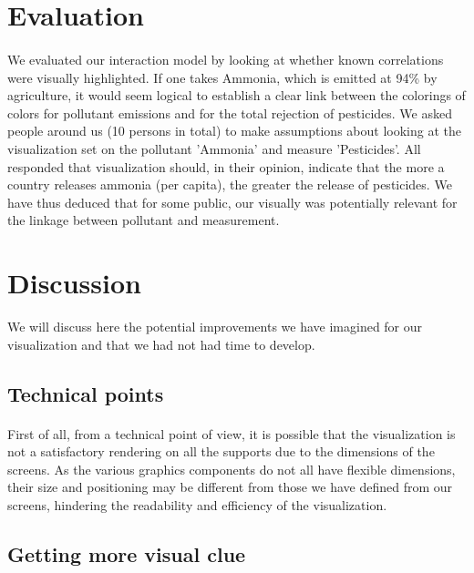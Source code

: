 \documentclass[preprint,journal]{vgtc}       %
\begin{document}
\section{Evaluation}

\paragraph{}
We evaluated our interaction model by looking at whether known correlations were visually highlighted.
If one takes Ammonia, which is emitted at 94\% by agriculture, it would seem logical to establish a clear link between the colorings of colors for pollutant emissions and for the total rejection of pesticides. We asked people around us (10 persons in total) to make assumptions about looking at the visualization set on the pollutant 'Ammonia' and measure 'Pesticides'. All responded that visualization should, in their opinion, indicate that the more a country releases ammonia (per capita), the greater the release of pesticides. We have thus deduced that for some public, our visually was potentially relevant for the linkage between pollutant and measurement.

\section{Discussion}

We will discuss here the potential improvements we have imagined for our visualization and that we had not had time to develop. 

\subsection{Technical points}

\paragraph{}
First of all, from a technical point of view, it is possible that the visualization is not a satisfactory rendering on all the supports due to the dimensions of the screens. As the various graphics components do not all have flexible dimensions, their size and positioning may be different from those we have defined from our screens, hindering the readability and efficiency of the visualization. 


\subsection{Getting more visual clue}
\end{document}
